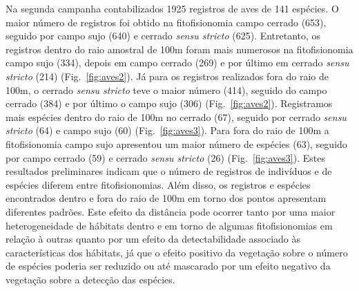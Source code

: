 \begin{description}
Na segunda campanha
contabilizados 1925 registros de aves de 141 espécies.
O maior número de
registros foi obtido na fitofisionomia campo cerrado (653), seguido
por campo sujo (640) e cerrado \textit{sensu stricto}
(625). Entretanto, os
registros dentro do raio amostral de 100m foram mais numerosos na
fitofisionomia campo sujo (334), depois em campo cerrado (269) e por
último em cerrado \textit{sensu stricto} (214) (Fig.~\ref{fig:aves2}). 
Já para os
registros realizados fora do raio de 100m,
o cerrado \textit{sensu stricto} teve o maior número (414), 
seguido do campo cerrado (384) e
por último o campo sujo (306) (Fig.~\ref{fig:aves2}). 
Registramos mais espécies dentro do raio de 100m no
cerrado (67), seguido por cerrado \textit{sensu stricto} (64) e campo
sujo (60) (Fig.~\ref{fig:aves3}). Para fora do raio de 100m 
a fitofisionomia campo sujo apresentou um maior número de espécies (63), seguido por campo
cerrado (59) e cerrado \textit{sensu stricto} (26) (Fig.~\ref{fig:aves3}).
Estes resultados preliminares indicam que o número de registros de indivíduos e de espécies
diferem entre fitofisionomias. Além disso, 
os registros e espécies encontrados dentro e fora do raio de 100m
em torno dos pontos apresentam diferentes padrões. Este efeito da
distância pode ocorrer tanto por uma maior heterogeneidade de hábitats
dentro e em torno de algumas fitofisionomias em relação à outras quanto por um
efeito da detectabilidade associado às características dos hábitats,
já que o efeito positivo da vegetação sobre o número de espécies
poderia ser reduzido ou até mascarado por um efeito negativo da
vegetação sobre a detecção das espécies.


\end{description}
